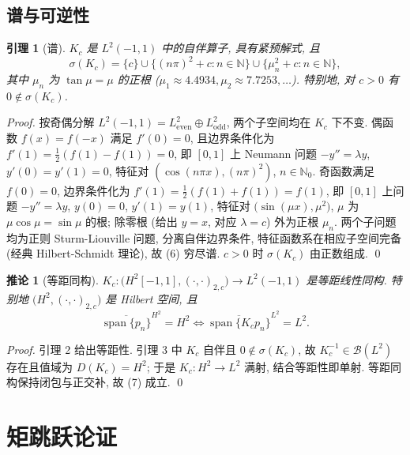 \documentclass[UTF8]{ctexart}
\newtheorem{lemma}[theorem]{引理}
\newtheorem{corollary}[theorem]{推论}
\begin{document}
\subsection{谱与可逆性}

\begin{lemma}[谱]
$K_c$ 是 $L^2(-1,1)$ 中的自伴算子, 具有紧预解式, 且
\begin{equation}
	\sigma(K_c) = \{ c \} \cup \bigl\{ (n\pi)^2 + c : n \in \mathbb{N} \bigr\}
		\cup \bigl\{ \mu_n^2 + c : n \in \mathbb{N} \bigr\},
\end{equation}
其中 $\mu_n$ 为 $\tan\mu = \mu$ 的正根 ($\mu_1 \approx 4.4934, \mu_2 \approx 7.7253, \dots$).
特别地, 对 $c > 0$ 有 $0 \notin \sigma(K_c)$.
\end{lemma}

\begin{proof}
按奇偶分解 $L^2(-1,1) = L^2_{\mathrm{even}} \oplus L^2_{\mathrm{odd}}$, 两个子空间均在
$K_c$ 下不变. 偶函数 $f(x) = f(-x)$ 满足 $f'(0) = 0$, 且边界条件化为
$f'(1) = \tfrac12(f(1)-f(1)) = 0$, 即 $[0,1]$ 上 Neumann 问题
$-y'' = \lambda y$, $y'(0) = y'(1) = 0$, 特征对 $(\cos(n\pi x), (n\pi)^2)$, $n \in \mathbb{N}_0$.
奇函数满足 $f(0) = 0$, 边界条件化为 $f'(1) = \tfrac12(f(1)+f(1)) = f(1)$, 即
$[0,1]$ 上问题 $-y'' = \lambda y$, $y(0) = 0$, $y'(1) = y(1)$, 特征对
$\bigl(\sin(\mu x), \mu^2\bigr)$, $\mu$ 为 $\mu\cos\mu = \sin\mu$ 的根; 除零根
(给出 $y = x$, 对应 $\lambda = c$) 外为正根 $\mu_n$. 两个子问题均为正则
Sturm-Liouville 问题, 分离自伴边界条件, 特征函数系在相应子空间完备
(经典 Hilbert-Schmidt 理论), 故 (6) 穷尽谱. $c > 0$ 时 $\sigma(K_c)$ 由正数组成. \qed
\end{proof}

\begin{corollary}[等距同构]
$K_c: \bigl( H^2[-1,1], (\cdot,\cdot)_{2,c} \bigr) \to L^2(-1,1)$
是等距线性同构. 特别地 $\bigl( H^2, (\cdot,\cdot)_{2,c} \bigr)$ 是 Hilbert 空间,
且
\[
	\overline{\operatorname{span}\{ p_n \}}^{H^2} = H^2
	\iff
	\overline{\operatorname{span}\{ K_c p_n \}}^{L^2} = L^2 .
\]
\end{corollary}

\begin{proof}
引理 2 给出等距性. 引理 3 中 $K_c$ 自伴且 $0 \notin \sigma(K_c)$,
故 $K_c^{-1} \in \mathcal{B}(L^2)$ 存在且值域为 $D(K_c) = H^2$; 于是 $K_c: H^2 \to L^2$
满射, 结合等距性即单射. 等距同构保持闭包与正交补, 故 (7) 成立. \qed
\end{proof}

\section{矩跳跃论证}
\end{document}
